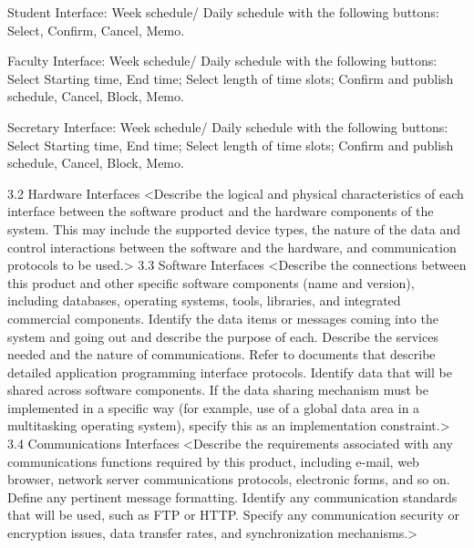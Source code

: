 Student Interface: Week schedule/ Daily schedule with the following buttons:
Select, Confirm, Cancel, Memo.

Faculty Interface: Week schedule/ Daily schedule with the following buttons:
Select Starting time, End time; Select length of time slots; Confirm and publish schedule, Cancel, Block, Memo.

Secretary Interface: Week schedule/ Daily schedule with the following buttons:
Select Starting time, End time; Select length of time slots; Confirm and publish schedule, Cancel, Block, Memo.


3.2	Hardware Interfaces
<Describe the logical and physical characteristics of each interface between the software product and the hardware components of the system. This may include the supported device types, the nature of the data and control interactions between the software and the hardware, and communication protocols to be used.>
3.3	Software Interfaces
<Describe the connections between this product and other specific software components (name and version), including databases, operating systems, tools, libraries, and integrated commercial components. Identify the data items or messages coming into the system and going out and describe the purpose of each. Describe the services needed and the nature of communications. Refer to documents that describe detailed application programming interface protocols. Identify data that will be shared across software components. If the data sharing mechanism must be implemented in a specific way (for example, use of a global data area in a multitasking operating system), specify this as an implementation constraint.>
3.4	Communications Interfaces
<Describe the requirements associated with any communications functions required by this product, including e-mail, web browser, network server communications protocols, electronic forms, and so on. Define any pertinent message formatting. Identify any communication standards that will be used, such as FTP or HTTP. Specify any communication security or encryption issues, data transfer rates, and synchronization mechanisms.>

